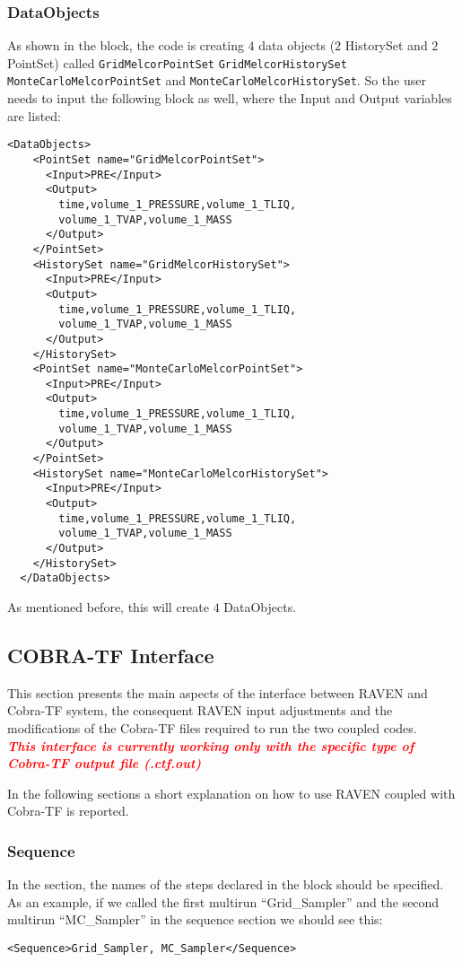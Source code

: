 \subsubsection{DataObjects}
As shown in the  block, the code is creating $4$ data objects ($2$ HistorySet and $2$ PointSet)
called \texttt{GridMelcorPointSet} \texttt{GridMelcorHistorySet} \texttt{MonteCarloMelcorPointSet} and
 \texttt{MonteCarloMelcorHistorySet}.
%
So the user needs to input the following block as well, where the Input and Output variables are listed:
\begin{lstlisting}[style=XML]
  <DataObjects>
    <PointSet name="GridMelcorPointSet">
      <Input>PRE</Input>
      <Output>
        time,volume_1_PRESSURE,volume_1_TLIQ,
        volume_1_TVAP,volume_1_MASS
      </Output>
    </PointSet>
    <HistorySet name="GridMelcorHistorySet">
      <Input>PRE</Input>
      <Output>
        time,volume_1_PRESSURE,volume_1_TLIQ,
        volume_1_TVAP,volume_1_MASS
      </Output>
    </HistorySet>
    <PointSet name="MonteCarloMelcorPointSet">
      <Input>PRE</Input>
      <Output>
        time,volume_1_PRESSURE,volume_1_TLIQ,
        volume_1_TVAP,volume_1_MASS
      </Output>
    </PointSet>
    <HistorySet name="MonteCarloMelcorHistorySet">
      <Input>PRE</Input>
      <Output>
        time,volume_1_PRESSURE,volume_1_TLIQ,
        volume_1_TVAP,volume_1_MASS
      </Output>
    </HistorySet>
  </DataObjects>
\end{lstlisting}
As mentioned before, this will create $4$ DataObjects.
%
\subsection{COBRA-TF Interface}
This section presents the main aspects of the interface between RAVEN and Cobra-TF system,
the consequent RAVEN input adjustments and the modifications of the Cobra-TF
files required to run the two coupled codes.
\\ \textcolor{red}{
\textbf{\textit{\nb This interface is currently working only with the specific type of Cobra-TF output file (.ctf.out) }}	
}

In the following sections a short explanation on how to use RAVEN coupled with Cobra-TF is reported.
\subsubsection{Sequence}
In the  section, the names of the steps declared in the
 block should be specified.
%
As an example, if we called the first multirun ``Grid\_Sampler'' and the second
multirun ``MC\_Sampler'' in the sequence section we should see this:
\begin{lstlisting}[style=XML]
<Sequence>Grid_Sampler, MC_Sampler</Sequence>
\end{lstlisting}

